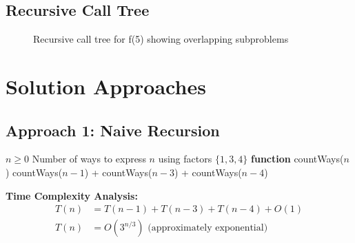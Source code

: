 \documentclass[12pt,a4paper]{article}
\begin{document}
\subsection{Recursive Call Tree}

\begin{figure}[h]
\centering
{}
\caption{Recursive call tree for f(5) showing overlapping subproblems}
\end{figure}

\section{Solution Approaches}

\subsection{Approach 1: Naive Recursion}

\begin{algorithm}
\caption{Number Factor - Recursive Approach}
\begin{algorithmic}
\REQUIRE $n \geq 0$
\ENSURE Number of ways to express $n$ using factors $\{1, 3, 4\}$
\STATE \textbf{function} countWays($n$)
\ENDIF
{}
\ENDIF
\RETURN countWays($n-1$) + countWays($n-3$) + countWays($n-4$)
\end{algorithmic}
\end{algorithm}

\textbf{Time Complexity Analysis:}
\begin{align}
T(n) &= T(n-1) + T(n-3) + T(n-4) + O(1) \nonumber \\
T(n) &= O(3^{n/3}) \text{ (approximately exponential)} \nonumber
\end{align}
\end{document}
